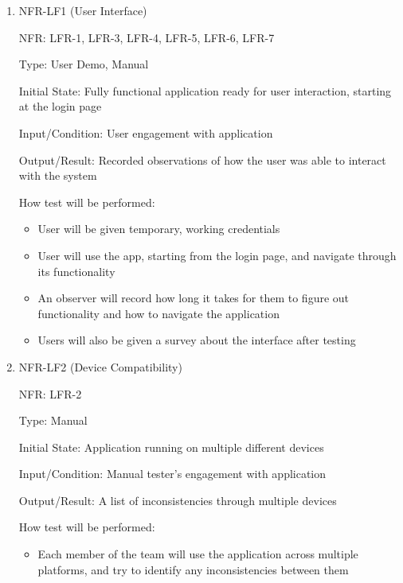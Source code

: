 \documentclass[12pt, titlepage]{article}
\begin{document}
\begin{enumerate}

\item{NFR-LF1 (User Interface)\\}

NFR: LFR-1, LFR-3, LFR-4, LFR-5, LFR-6, LFR-7

Type: User Demo, Manual

Initial State: Fully functional application ready for user interaction, starting
at the login page

Input/Condition: User engagement with application 

Output/Result: Recorded observations of how the user was able to interact with
the system 

How test will be performed: 
\begin{itemize}
  \item User will be given temporary, working credentials 
  \item User will use the app, starting from the login page, and navigate
  through its functionality
  \item An observer will record how long it takes for them to figure out
  functionality and how to navigate the application
  \item Users will also be given a survey about the interface after testing

\end{itemize}
					
\item{NFR-LF2 (Device Compatibility)\\}

NFR: LFR-2

Type: Manual

Initial State: Application running on multiple different devices

Input/Condition: Manual tester's engagement with application

Output/Result: A list of inconsistencies through multiple devices

How test will be performed: 
\begin{itemize}
  \item Each member of the team will use the application across multiple
  platforms, and try to identify any inconsistencies between them
\end{itemize}
\end{enumerate}
\end{document}
